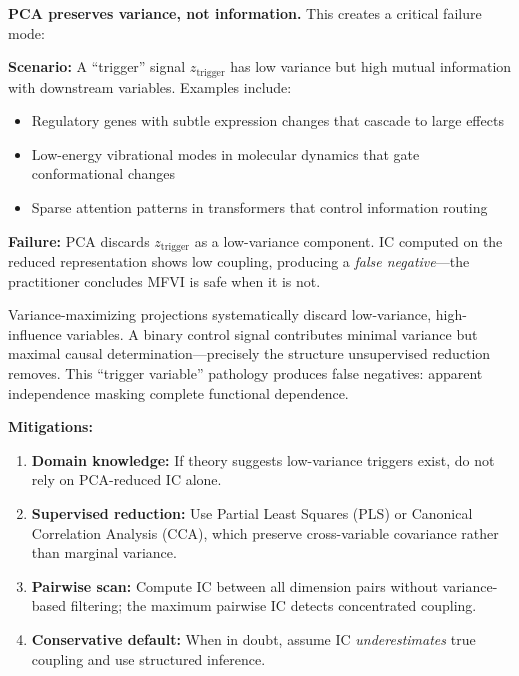 \documentclass[10pt]{article} %
\theoremstyle{plain}
\theoremstyle{definition}
\begin{document}
\begin{tcolorbox}[breakable, colback=gray!5, colframe=black!75, title=\textbf{Warning: PCA Failure Mode}, fonttitle=\bfseries]
\textbf{PCA preserves variance, not information.} This creates a critical failure mode:

\textbf{Scenario:} A ``trigger'' signal $z_{\text{trigger}}$ has low variance but high mutual information with downstream variables. Examples include:
\begin{itemize}
    \item Regulatory genes with subtle expression changes that cascade to large effects
    \item Low-energy vibrational modes in molecular dynamics that gate conformational changes
    \item Sparse attention patterns in transformers that control information routing
\end{itemize}

\textbf{Failure:} PCA discards $z_{\text{trigger}}$ as a low-variance component. IC computed on the reduced representation shows low coupling, producing a \emph{false negative}---the practitioner concludes MFVI is safe when it is not.

Variance-maximizing projections systematically discard low-variance, high-influence variables. A binary control signal contributes minimal variance but maximal causal determination---precisely the structure unsupervised reduction removes. This ``trigger variable'' pathology produces false negatives: apparent independence masking complete functional dependence.

\textbf{Mitigations:}
\begin{enumerate}
    \item \textbf{Domain knowledge:} If theory suggests low-variance triggers exist, do not rely on PCA-reduced IC alone.
    \item \textbf{Supervised reduction:} Use Partial Least Squares (PLS) or Canonical Correlation Analysis (CCA), which preserve cross-variable covariance rather than marginal variance.
    \item \textbf{Pairwise scan:} Compute IC between all dimension pairs without variance-based filtering; the maximum pairwise IC detects concentrated coupling.
    \item \textbf{Conservative default:} When in doubt, assume IC \emph{underestimates} true coupling and use structured inference.
\end{enumerate}
\end{tcolorbox}
\end{document}
